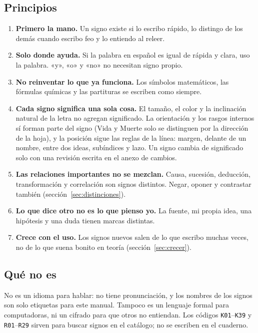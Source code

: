 \subsection{Principios}
\begin{enumerate}
\item \textbf{Primero la mano.} Un signo existe si lo escribo rápido, lo
 distingo de los demás cuando escribo feo y lo entiendo al releer.
\item \textbf{Solo donde ayuda.} Si la palabra en español es igual de rápida y
 clara, uso la palabra. «y», «o» y «no» no necesitan signo propio.
\item \textbf{No reinventar lo que ya funciona.} Los símbolos matemáticos,
 las fórmulas químicas y las partituras se escriben como siempre.
\item \textbf{Cada signo significa una sola cosa.} El tamaño, el color y la
 inclinación natural de la letra no agregan significado. La orientación y los
 rasgos internos sí forman parte del signo (Vida y Muerte solo se distinguen
 por la dirección de la hoja), y la posición sigue las reglas de la línea:
 margen, delante de un nombre, entre dos ideas, subíndices y lazo. Un signo cambia de significado solo
 con una revisión escrita en el anexo de cambios.
\item \textbf{Las relaciones importantes no se mezclan.} Causa, sucesión,
 deducción, transformación y correlación son signos distintos. Negar, oponer y
 contrastar también (sección~\ref{sec:distinciones}).
\item \textbf{Lo que dice otro no es lo que pienso yo.} La fuente, mi propia idea,
 una hipótesis y una duda tienen marcas distintas.
\item \textbf{Crece con el uso.} Los signos nuevos salen de lo que escribo
 muchas veces, no de lo que suena bonito en teoría (sección~\ref{sec:crecer}).
\end{enumerate}

\subsection{Qué no es}
No es un idioma para hablar: no tiene pronunciación, y los nombres de los signos
son solo etiquetas para este manual. Tampoco es un lenguaje formal para
computadoras, ni un cifrado para que otros no entiendan. Los códigos
\texttt{K01}--\texttt{K39} y \texttt{R01}--\texttt{R29} sirven para buscar
signos en el catálogo; no se escriben en el cuaderno.
